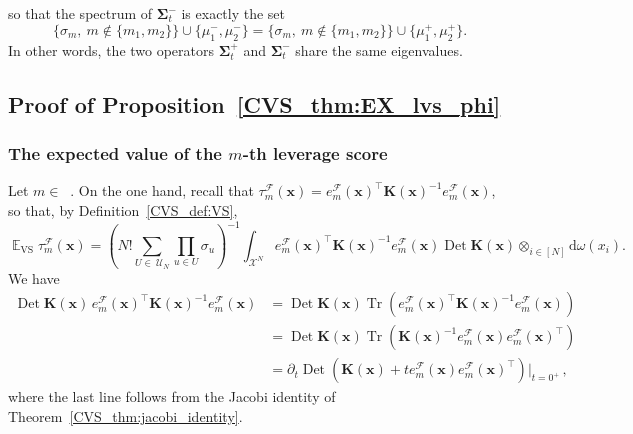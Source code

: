 \documentclass[twoside,11pt]{book}
\numberwithin{theorem}{chapter}
\numberwithin{definition}{chapter}
\numberwithin{proposition}{chapter}
\numberwithin{corollary}{chapter}
\numberwithin{example}{chapter}
\numberwithin{lemma}{chapter}
\numberwithin{assumption}{chapter}
\numberwithin{equation}{chapter}
\numberwithin{figure}{chapter}
\DeclareMathOperator{\Tr}{Tr}
\DeclareMathOperator{\Det}{Det}
\DeclareMathOperator{\VS}{\mathrm{VS}}
\DeclareMathOperator{\Tran}{\intercal}
\DeclareMathOperator{\EX}{\mathbb{E}}
\DeclareMathOperator{\F}{\mathcal{F}}
\DeclareMathOperator{\Ns}{\mathbb{N}^{*}}
\def\UN{\:\mathcal{U}_N}
\begin{document}
so that the spectrum of $\bm{\Sigma}_{t}^{-}$ is exactly the set
\begin{equation}
\{ \sigma_{m}, \: m \notin  \{m_{1},m_{2}\}\} \cup \{\mu_{1}^{-}, \mu_{2}^{-} \} = \{ \sigma_{m}, \: m \notin  \{m_{1},m_{2}\}\} \cup \{\mu_{1}^{+}, \mu_{2}^{+} \}.
\end{equation}
In other words, the two operators $\bm{\Sigma}_{t}^{+}$ and $\bm{\Sigma}_{t}^{-}$ share the same eigenvalues.


\subsection{Proof of Proposition~\ref{CVS_thm:EX_lvs_phi}}\label{CVS_app:proof_EX_lvs_phi}
\subsubsection{The expected value of the $m$-th leverage score \label{CVS_sec:proof_EX_VS_lvs_n_diff_phi}}
Let $m \in \Ns$. On the one hand, recall that $\tau_{m}^{\F}(\bm{x}) = e_{m}^{\mathcal{F}}(\bm{x})^{\Tran}\bm{K}(\bm{x})^{-1}e_{m}^{\mathcal{F}}(\bm{x})$, so that, by Definition~\ref{CVS_def:VS},
\begin{equation}
  \label{CVS_e:just_def_of_VS}
\EX_{\VS} \tau_{m}^{\F}(\bm{x}) = \left( N!\sum\limits_{U\in\UN}\prod\limits_{u \in U}\sigma_{u} \right)^{-1} \int_{\mathcal{X}^{N}} e_{m}^{\mathcal{F}}(\bm{x})^{\Tran}\bm{K}(\bm{x})^{-1}e_{m}^{\mathcal{F}}(\bm{x}) \Det \bm{K}(\bm{x}) \otimes_{i \in [N]} \mathrm{d}\omega(x_{i}).
\end{equation}
We have
\begin{align}
\Det \bm{K}(\bm{x})\,e_{m}^{\mathcal{F}}(\bm{x})^{\Tran}\bm{K}(\bm{x})^{-1}e_{m}^{\mathcal{F}}(\bm{x}) & = \Det \bm{K}(\bm{x})\Tr \left( e_{m}^{\mathcal{F}}(\bm{x})^{\Tran}\bm{K}(\bm{x})^{-1}e_{m}^{\mathcal{F}}(\bm{x}) \right) \nonumber \\
& = \Det \bm{K}(\bm{x})\Tr \left(\bm{K}(\bm{x})^{-1}e_{m}^{\mathcal{F}}(\bm{x})e_{m}^{\mathcal{F}}(\bm{x})^{\Tran}\right)\nonumber\\
&= \partial_{t} \Det (\bm{K}(\bm{x})+t e_{m}^{\mathcal{F}}(\bm{x})e_{m}^{\mathcal{F}}(\bm{x})^{\Tran})|_{t = 0^{+}}\,,\label{CVS_e:derivative_inside_the_integral}
\end{align}
where the last line follows from the Jacobi identity of Theorem~\ref{CVS_thm:jacobi_identity}.
\end{document}
